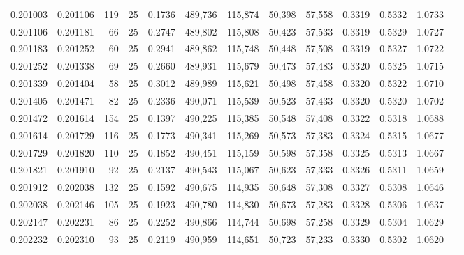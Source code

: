 \begin{tabular}{rrrrrrrrrrrrr}
0.201003 & 0.201106 &   119 &  25 &                                     0.1736 & 489,736 & 115,874 &  50,398 &  57,558 & 0.3319 & 0.5332 & 1.0733 \\
0.201106 & 0.201181 &    66 &  25 &                                     0.2747 & 489,802 & 115,808 &  50,423 &  57,533 & 0.3319 & 0.5329 & 1.0727 \\
0.201183 & 0.201252 &    60 &  25 &                                     0.2941 & 489,862 & 115,748 &  50,448 &  57,508 & 0.3319 & 0.5327 & 1.0722 \\
0.201252 & 0.201338 &    69 &  25 &                                     0.2660 & 489,931 & 115,679 &  50,473 &  57,483 & 0.3320 & 0.5325 & 1.0715 \\
0.201339 & 0.201404 &    58 &  25 &                                     0.3012 & 489,989 & 115,621 &  50,498 &  57,458 & 0.3320 & 0.5322 & 1.0710 \\
0.201405 & 0.201471 &    82 &  25 &                                     0.2336 & 490,071 & 115,539 &  50,523 &  57,433 & 0.3320 & 0.5320 & 1.0702 \\
0.201472 & 0.201614 &   154 &  25 &                                     0.1397 & 490,225 & 115,385 &  50,548 &  57,408 & 0.3322 & 0.5318 & 1.0688 \\
0.201614 & 0.201729 &   116 &  25 &                                     0.1773 & 490,341 & 115,269 &  50,573 &  57,383 & 0.3324 & 0.5315 & 1.0677 \\
0.201729 & 0.201820 &   110 &  25 &                                     0.1852 & 490,451 & 115,159 &  50,598 &  57,358 & 0.3325 & 0.5313 & 1.0667 \\
0.201821 & 0.201910 &    92 &  25 &                                     0.2137 & 490,543 & 115,067 &  50,623 &  57,333 & 0.3326 & 0.5311 & 1.0659 \\
0.201912 & 0.202038 &   132 &  25 &                                     0.1592 & 490,675 & 114,935 &  50,648 &  57,308 & 0.3327 & 0.5308 & 1.0646 \\
0.202038 & 0.202146 &   105 &  25 &                                     0.1923 & 490,780 & 114,830 &  50,673 &  57,283 & 0.3328 & 0.5306 & 1.0637 \\
0.202147 & 0.202231 &    86 &  25 &                                     0.2252 & 490,866 & 114,744 &  50,698 &  57,258 & 0.3329 & 0.5304 & 1.0629 \\
0.202232 & 0.202310 &    93 &  25 &                                     0.2119 & 490,959 & 114,651 &  50,723 &  57,233 & 0.3330 & 0.5302 & 1.0620 \\

\end{tabular}
